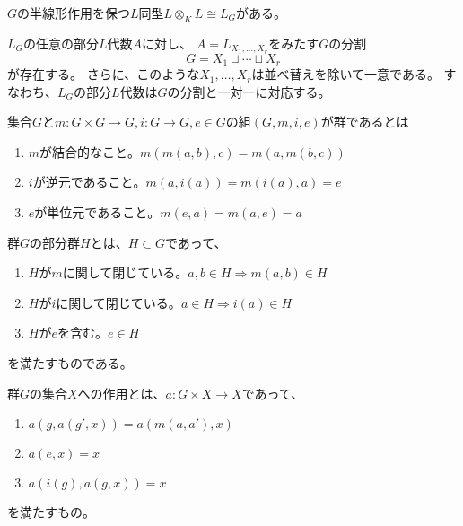 \begin{proposition}\label{ext-self}
    $G$の半線形作用を保つ$L$同型$L\otimes_KL\cong L_G$がある。
\end{proposition}

\begin{proposition}\label{subalgebra-decomp}
    $L_G$の任意の部分$L$代数$A$に対し、
    $A=L_{X_1,\ldots,X_r}$をみたす$G$の分割$$G=X_1\sqcup \cdots\sqcup X_r$$が存在する。
    さらに、このような$X_1,\ldots,X_r$は並べ替えを除いて一意である。
    すなわち、$L_G$の部分$L$代数は$G$の分割と一対一に対応する。
\end{proposition}

\begin{definition}\label{group-def}
    \leanok
    集合$G$と$m:G\times G\to G, i:G\to G, e\in G$の組$(G,m,i,e)$が群であるとは
    \begin{enumerate}
        \item $m$が結合的なこと。$m(m(a,b),c)=m(a,m(b,c))$
        \item $i$が逆元であること。$m(a,i(a))=m(i(a),a)=e$
        \item $e$が単位元であること。$m(e,a)=m(a,e)=a$
    \end{enumerate}
\end{definition}

\begin{definition}\label{subgroup-def}
    \leanok
    群$G$の部分群$H$とは、$H\subset G$であって、
    \begin{enumerate}
        \item $H$が$m$に関して閉じている。$a,b\in H\Rightarrow m(a,b)\in H$
        \item $H$が$i$に関して閉じている。$a\in H\Rightarrow i(a)\in H$
        \item $H$が$e$を含む。$e\in H$
    \end{enumerate}
    を満たすものである。
\end{definition}

\begin{definition}\label{action-def}
    群$G$の集合$X$への作用とは、$a:G\times X\to X$であって、
    \begin{enumerate}
        \item $a(g,a(g',x))=a(m(a,a'),x)$
        \item $a(e,x)=x$
        \item $a(i(g),a(g,x))=x$
    \end{enumerate}
    を満たすもの。
\end{definition}

